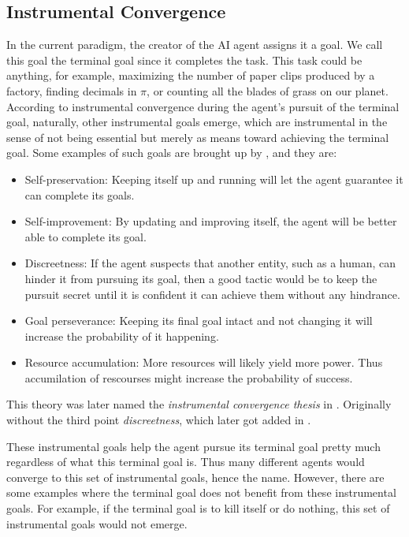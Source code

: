 \documentclass[12pt,A4]{report}
\theoremstyle{definition}
\begin{document}
\subsection{Instrumental Convergence}
In the current paradigm, the creator of the AI agent assigns it a goal. We call this goal the terminal goal since it completes the task. This task could be anything, for example, maximizing the number of paper clips produced by a factory, finding decimals in $\pi$, or counting all the blades of grass on our planet. According to instrumental convergence during the agent's pursuit of the terminal goal, naturally, other instrumental goals emerge, which are instrumental in the sense of not being essential but merely as means toward achieving the terminal goal. Some examples of such goals are brought up by \citet{Omohundro08}, and they are: 
\begin{itemize}
    \item Self-preservation: Keeping itself up and running will let the agent guarantee it can complete its goals.
    \item Self-improvement: By updating and improving itself, the agent will be better able to complete its goal.
    \item Discreetness: If the agent suspects that another entity, such as a human, can hinder it from pursuing its goal, then a good tactic would be to keep the pursuit secret until it is confident it can achieve them without any hindrance. 
    \item Goal perseverance: Keeping its final goal intact and not changing it will increase the probability of it happening. 
    \item Resource accumulation: More resources will likely yield more power. Thus accumilation of rescourses might increase the probability of success.
\end{itemize}
This theory was later named the \textit{instrumental convergence thesis} in \citet{Bostrom12}. Originally without the third point \textit{discreetness}, which later got added in \citet{Bostrom14}.

These instrumental goals help the agent pursue its terminal goal pretty much regardless of what this terminal goal is. Thus many different agents would converge to this set of instrumental goals, hence the name. However, there are some examples where the terminal goal does not benefit from these instrumental goals. For example, if the terminal goal is to kill itself or do nothing, this set of instrumental goals would not emerge. 
\end{document}
